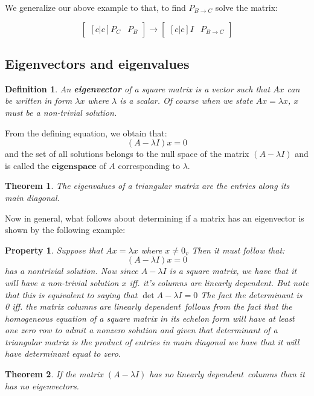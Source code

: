 \documentclass[titlepage]{article}
\newtheorem{thm}{Theorem}[subsection]
\newtheorem{property}{Property}
\newtheorem{definition}{Definition}[subsection]
\numberwithin{equation}{subsection}
\newcommand{\ld}{linearly dependent}
\begin{document}
We generalize our above example to that, to find $P_{B\to C}$ solve the matrix:

$$\begin{bmatrix}[c|c]
    P_{C} & P_{B}
\end{bmatrix} \rightarrow \begin{bmatrix}[c|c]
    I & P_{B\to C}
\end{bmatrix}$$

\subsection{Eigenvectors and eigenvalues}

\begin{definition}
An \textbf{eigenvector} of a square matrix is a vector such that $Ax$ can be written in form $\lambda x$ where $\lambda$ is a scalar. Of course when we state $Ax=\lambda x$, $x$ must be a non-trivial solution. 
\end{definition}

From the defining equation, we obtain that:
$$ (A - \lambda I)x = 0$$ and the set of all solutions belongs to the null space of the matrix $(A - \lambda I)$ and is called the $\textbf{eigenspace}$ of $A$ corresponding to $\lambda$. 

\begin{thm}
\label{eig}
The eigenvalues of a triangular matrix are the entries along its main diagonal.
\end{thm}

Now in general, what follows about determining if a matrix has an eigenvector is shown by the  following example:

\begin{property}
Suppose that $Ax = \lambda x$ where $x\not = 0_{v}$ Then it must follow that:
$$(A-\lambda I)x=0$$ has a nontrivial solution. Now since $A-\lambda I$ is a square matrix, we have that it will have a non-trivial solution $x$ iff. it's columns are linearly dependent. But note that this is equivalent to saying that $\det{A-\lambda I} = 0$ The fact the determinant is 0 iff. the matrix columns are \ld \ follows from the fact that the homogeneous equation of a square matrix in its echelon form will have at least one zero row to admit a nonzero solution and given that determinant of a triangular matrix is the product of entries in main diagonal we have that it will have determinant equal to zero. 
\end{property} 

\begin{thm}
If the matrix $(A-\lambda I)$ has no \ld \ columns than it has no eigenvectors. 
\end{thm}
\end{document}
